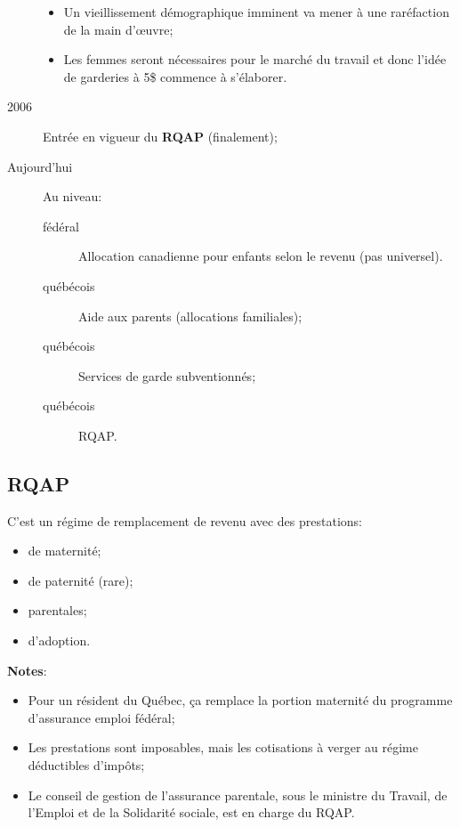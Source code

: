 \documentclass[10pt, french]{article}
\begin{document}
\begin{multicols*}{3}
\begin{description}
\begin{itemize}[leftmargin = *]
		\item	Un vieillissement démographique imminent va mener à une raréfaction de la main d'œuvre;
		\item	Les femmes seront nécessaires pour le marché du travail et donc l'idée de garderies à 5\$ commence à s'élaborer.
		\end{itemize}
	\item[2006]	Entrée en vigueur du \textbf{\textcolor{blue(pigment)}{RQAP}} (finalement);
	\item[Aujourd'hui]	Au niveau:
		\begin{description}
		\item[\textcolor{bulgarianrose}{fédéral}]	Allocation canadienne pour enfants selon le revenu (pas universel).
		\item[\textcolor{blue(pigment)}{québécois}]	Aide aux parents (allocations familiales);
		\item[\textcolor{blue(pigment)}{québécois}]	Services de garde subventionnés;
		\item[\textcolor{blue(pigment)}{québécois}]	RQAP.
		\end{description}
\end{description}

\subsection*{RQAP}

C'est un régime de remplacement de revenu avec des prestations:
\begin{multicols*}{2}
\begin{itemize}[leftmargin = *]
\item	de maternité;
\item	de paternité (rare);
\item	parentales;
\item	d'adoption.
\end{itemize}
\end{multicols*}

\textbf{Notes}:
\begin{itemize}[leftmargin = *]
	\item	Pour un résident du \textcolor{blue(pigment)}{Québec}, ça remplace la portion maternité du programme d'assurance emploi \textcolor{bulgarianrose}{fédéral};
	\item	Les prestations sont imposables, mais les cotisations à verger au régime déductibles d'impôts;
	\item	Le conseil de gestion de l'assurance parentale, sous le ministre du Travail, de l'Emploi et de la Solidarité sociale, est en charge du RQAP.
\end{itemize}


\end{multicols*}
\end{document}
